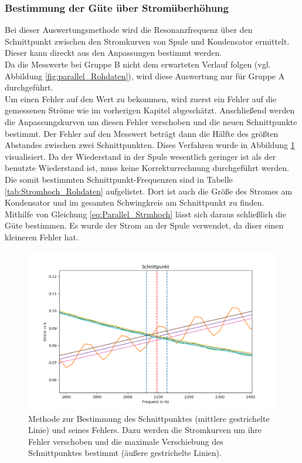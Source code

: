 \documentclass[12pt,a4paper]{article}
\begin{document}
\subsubsection{Bestimmung der Güte über Stromüberhöhung}
Bei dieser Auswertungsmethode wird die Resonanzfrequenz über den Schnittpunkt zwischen den Stromkurven von Spule und Kondensator ermittelt. Dieser kann direckt aus den Anpassungen bestimmt werden.\\
Da die Messwerte bei Gruppe B nicht dem erwarteten Verlauf folgen (vgl. Abbildung \ref{fig:parallel_Rohdaten}), wird diese Auswertung nur für Gruppe A durchgeführt.\\
Um einen Fehler auf den Wert zu bekommen, wird zuerst ein Fehler auf die gemessenen Ströme wie im vorherigen Kapitel abgeschätzt. Anschließend werden die Anpassungskurven um diesen Fehler verschoben und die neuen Schnittpunkte bestimmt. Der Fehler auf den Messwert beträgt dann die Hälfte des größten Abstandes zwischen zwei Schnittpunkten. Dises Verfahren wurde in Abbildung \ref{fig:parallel_Stromhoch} visualisiert.
Da der Wiederstand in der Spule wesentlich geringer ist als der benutzte Wiederstand ist, muss keine Korrekturrechnung durchgeführt werden.\\
Die somit bestimmten Schnittpunkt-Frequenzen sind in Tabelle \ref{tab:Stromhoch_Rohdaten} aufgelistet. Dort ist auch die Größe des Stromes am Kondensator und im gesamten Schwingkreis am Schnittpunkt zu finden. \\
Mithilfe von Gleichung \ref{eq:Parallel_Strmhoch} lässt sich daraus schließlich die Güte bestimmen. Es wurde der Strom an der Spule verwendet, da diser einen kleineren Fehler hat.

\begin{figure}
\centering
\includegraphics[scale=0.7]{Bilder/Parallel_Stromhoch.png}
\caption{Methode zur Bestimmung des Schnittpunktes (mittlere gestrichelte Linie) und seines Fehlers. Dazu werden die Stromkurven um ihre Fehler verschoben und die maximale Verschiebung des Schnittpunktes bestimmt (äußere gestrichelte Linien).}
\label{fig:parallel_Stromhoch}
\end{figure}
\end{document}
